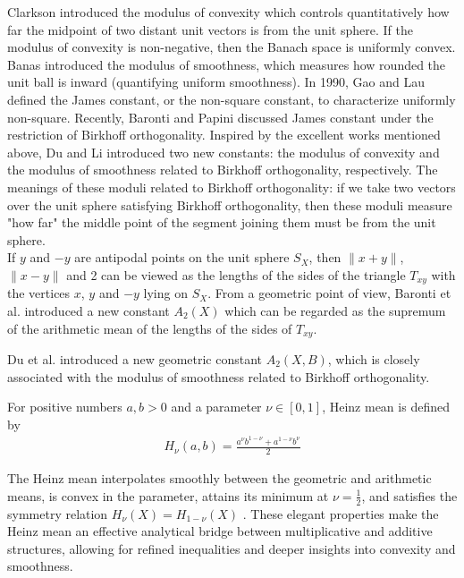 \documentclass[preprint,12pt]{elsarticle}
\numberwithin{equation}{section}
\begin{document}
Clarkson introduced the modulus of convexity \cite{clarkson1936uniformly} which controls quantitatively how far the midpoint of two distant unit vectors is from the unit sphere. If the modulus of convexity is non-negative, then the Banach space is uniformly convex. Banas \cite{banas1986moduli} introduced the modulus of smoothness, which measures how rounded the unit ball is inward (quantifying uniform smoothness).
In 1990, Gao and Lau \cite{gao1990geometry} defined the James constant, or
the non-square constant, to characterize uniformly non-square. 
 Recently, Baronti and Papini \cite{papini2022parameters} discussed James constant under the restriction of Birkhoff orthogonality. Inspired by the excellent works mentioned above, Du and Li \cite{du2023some} introduced two new constants: the modulus of convexity and the modulus of smoothness related to Birkhoff orthogonality, respectively. The meanings of these moduli related to Birkhoff orthogonality: if we take two vectors over the unit sphere satisfying Birkhoff orthogonality, then these moduli measure "how far" the middle point of the segment joining them must be from the unit sphere.\\
If $y$ and $-y$ are antipodal points on the unit sphere $S_X$, then $\|x+y\|$, $\|x-y\|$ 
 and 2 can be viewed as the lengths of the sides of the triangle $T_{xy}$
 with the vertices $x$, $y$ and $-y$
 lying on $S_X$. From a geometric point of view,
Baronti et al. \cite{baronti2000triangles} introduced a new constant $A_2(X)$ which
 can be regarded as the supremum of the arithmetic mean of the lengths of the sides of $T_{xy}$.

Du et al. \cite{du2025some} introduced a new geometric constant $A_2(X,B)$, which is closely associated with the modulus of smoothness 
 related to Birkhoff orthogonality.



 
 

For positive numbers $a,b>0$ and a parameter $\nu\in[0,1]$, Heinz mean is defined by
\begin{align*}
{H}_{\nu}(a,b)=\frac{a^\nu b^{1-\nu}+a^{1-\nu}b^\nu}{2}
\end{align*}

The Heinz mean interpolates smoothly between the geometric and arithmetic means, is convex in the parameter, attains its minimum at $\nu=\frac{1}{2}$, and satisfies the symmetry relation $H_{\nu}(X)=H_{1-\nu}(X)$
. These elegant properties make the Heinz mean an effective analytical bridge between multiplicative and additive structures, allowing for refined inequalities and deeper insights into convexity and smoothness.
\end{document}
